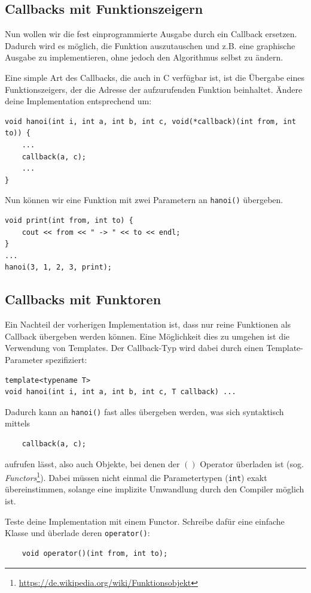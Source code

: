 \subsection{Callbacks mit Funktionszeigern}
Nun wollen wir die fest einprogrammierte Ausgabe durch ein Callback ersetzen. Dadurch wird es möglich, die Funktion auszutauschen und z.B. eine graphische Ausgabe zu implementieren, ohne jedoch den Algorithmus selbst zu ändern.

Eine simple Art des Callbacks, die auch in C verfügbar ist, ist die Übergabe eines Funktionszeigers, der die Adresse der aufzurufenden Funktion beinhaltet.
Ändere deine Implementation entsprechend um:

\begin{lstlisting}
void hanoi(int i, int a, int b, int c, void(*callback)(int from, int to)) {
	...
	callback(a, c);
	...
}
\end{lstlisting}

Nun können wir eine Funktion mit zwei Parametern an \lstinline{hanoi()} übergeben.
\begin{lstlisting}
void print(int from, int to) {
	cout << from << " -> " << to << endl;
}
...
hanoi(3, 1, 2, 3, print);
\end{lstlisting}

\subsection{Callbacks mit Funktoren}
Ein Nachteil der vorherigen Implementation ist, dass nur reine Funktionen als Callback übergeben werden können.
Eine Möglichkeit dies zu umgehen ist die Verwendung von Templates.
Der Callback-Typ wird dabei durch einen Template-Parameter spezifiziert:
\begin{lstlisting}
template<typename T>
void hanoi(int i, int a, int b, int c, T callback) ...
\end{lstlisting}

Dadurch kann an \lstinline{hanoi()} fast alles übergeben werden, was sich syntaktisch mittels
\begin{lstlisting}
	callback(a, c);
\end{lstlisting}
aufrufen lässt, also auch Objekte, bei denen der $()$ Operator überladen ist (sog. \emph{Functors}\footnote{\url{https://de.wikipedia.org/wiki/Funktionsobjekt}}).
Dabei müssen nicht einmal die Parametertypen (\lstinline{int}) exakt übereinstimmen, solange eine implizite Umwandlung durch den Compiler möglich ist.

Teste deine Implementation mit einem Functor.
Schreibe dafür eine einfache Klasse und überlade deren \lstinline{operator()}:
\begin{lstlisting}
	void operator()(int from, int to);
\end{lstlisting}

